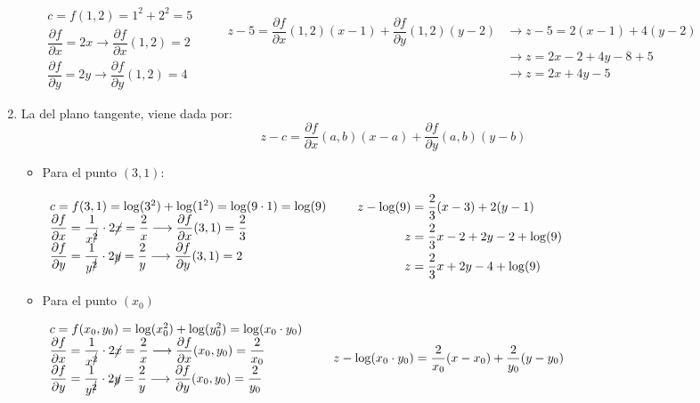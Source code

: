 \begin{enumerate}[label=\color{red}\textbf{\arabic*)}, leftmargin=*]
\begin{itemize}
$\begin{array}{l}
c=f(1,2)=1^2+2^2=5\\
\dfrac{\partial f}{\partial x}=2x\longrightarrow\dfrac{\partial f}{\partial x}(1,2)=2\\
\dfrac{\partial f}{\partial y}=2y\longrightarrow\dfrac{\partial f}{\partial y}(1,2)=4
\end{array}\qquad \begin{aligned}
z-5=\dfrac{\partial f}{\partial x}(1,2)(x-1)+\dfrac{\partial f}{\partial y}(1,2)(y-2)&\longrightarrow z-5=2(x-1)+4(y-2)\\
&\longrightarrow z=2x-2+4y-8+5\\
&\longrightarrow z=2x+4y-5
\end{aligned}$
\end{itemize}

\item {}

La del plano tangente, viene dada por: \[ z-c=\dfrac{\partial f}{\partial x}(a,b)(x-a)+\dfrac{\partial f}{\partial y}(a,b)(y-b) \]
\begin{itemize}
\item Para el punto $(3,1)$:

$\begin{array}{l}
c=f(3,1)=\log(3^2)+\log(1^2)=\log(9\cdot1)=\log(9)\\
\dfrac{\partial f}{\partial x}=\dfrac{1}{x^{\cancel{2}}}\cdot 2\cancel{x}=\dfrac{2}{x}\longrightarrow\dfrac{\partial f}{\partial x}(3,1)=\dfrac{2}{3}\\
\dfrac{\partial f}{\partial y}=\dfrac{1}{y^{\cancel{2}}}\cdot 2\cancel{y}=\dfrac{2}{y}\longrightarrow\dfrac{\partial f}{\partial y}(3,1)=2
\end{array}\qquad \begin{aligned}
z-\log(9)&=\dfrac{2}{3}(x-3)+2(y-1)\\
z&=\dfrac{2}{3}x-2+2y-2+\log(9)\\
z&=\dfrac{2}{3}x+2y-4+\log(9)
\end{aligned}$

\item Para el punto $(x_0)$

$\begin{array}{l}
c=f(x_0,y_0)=\log(x_0^2)+\log(y_0^2)=\log(x_0\cdot y_0)\\
\dfrac{\partial f}{\partial x}=\dfrac{1}{x^{\cancel{2}}}\cdot 2\cancel{x}=\dfrac{2}{x}\longrightarrow\dfrac{\partial f}{\partial x}(x_0,y_0)=\dfrac{2}{x_0}\\
\dfrac{\partial f}{\partial y}=\dfrac{1}{y^{\cancel{2}}}\cdot 2\cancel{y}=\dfrac{2}{y}\longrightarrow\dfrac{\partial f}{\partial y}(x_0,y_0)=\dfrac{2}{y_0}
\end{array}\qquad \begin{aligned}
z-\log(x_0\cdot y_0)&=\dfrac{2}{x_0}(x-x_0)+\dfrac{2}{y_0}(y-y_0)\\
\end{aligned}$
\end{itemize}


\end{enumerate}
